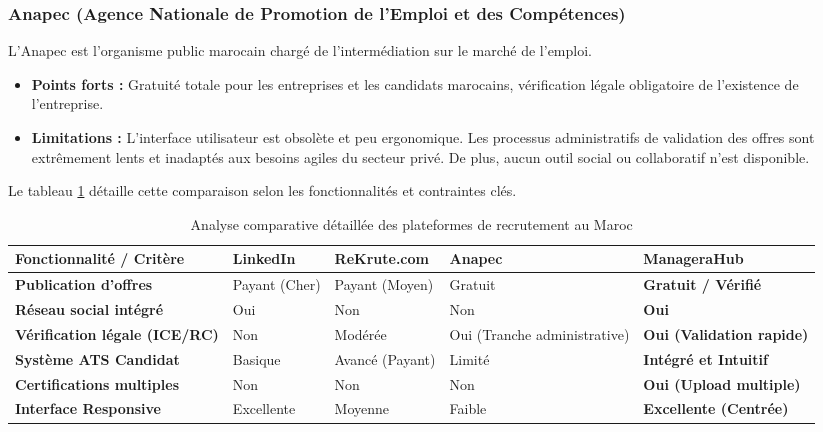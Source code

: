 \subsubsection{Anapec (Agence Nationale de Promotion de l'Emploi et des Compétences)}
L'Anapec est l'organisme public marocain chargé de l'intermédiation sur le marché de l'emploi.
\begin{itemize}
    \item \textbf{Points forts :} Gratuité totale pour les entreprises et les candidats marocains, vérification légale obligatoire de l'existence de l'entreprise.
    \item \textbf{Limitations :} L'interface utilisateur est obsolète et peu ergonomique. Les processus administratifs de validation des offres sont extrêmement lents et inadaptés aux besoins agiles du secteur privé. De plus, aucun outil social ou collaboratif n'est disponible.
\end{itemize}

Le tableau \ref{tab:comparatif_complet} détaille cette comparaison selon les fonctionnalités et contraintes clés.

\begin{table}[H]
\centering
\footnotesize
\begin{tabularx}{\textwidth}{l >{\raggedright\arraybackslash}X >{\raggedright\arraybackslash}X >{\raggedright\arraybackslash}X >{\raggedright\arraybackslash}X}
\toprule
\textbf{Fonctionnalité / Critère} & \textbf{LinkedIn} & \textbf{ReKrute.com} & \textbf{Anapec} & \textbf{ManageraHub} \\
\midrule
\textbf{Publication d'offres} & Payant (Cher) & Payant (Moyen) & Gratuit & \textbf{Gratuit / Vérifié} \\
\textbf{Réseau social intégré} & Oui & Non & Non & \textbf{Oui} \\
\textbf{Vérification légale (ICE/RC)} & Non & Modérée & Oui (Tranche administrative) & \textbf{Oui (Validation rapide)} \\
\textbf{Système ATS Candidat} & Basique & Avancé (Payant) & Limité & \textbf{Intégré et Intuitif} \\
\textbf{Certifications multiples} & Non & Non & Non & \textbf{Oui (Upload multiple)} \\
\textbf{Interface Responsive} & Excellente & Moyenne & Faible & \textbf{Excellente (Centrée)} \\
\bottomrule
\end{tabularx}
\caption{Analyse comparative détaillée des plateformes de recrutement au Maroc}
\label{tab:comparatif_complet}
\end{table}

